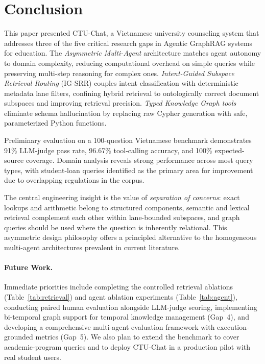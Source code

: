\documentclass[runningheads]{llncs}
\begin{document}
\section{Conclusion}
\label{sec:conclusion}

This paper presented CTU-Chat, a Vietnamese university counseling system that addresses three of the five critical research gaps in Agentic GraphRAG systems for education. The \emph{Asymmetric Multi-Agent} architecture matches agent autonomy to domain complexity, reducing computational overhead on simple queries while preserving multi-step reasoning for complex ones. \emph{Intent-Guided Subspace Retrieval Routing} (IG-SRR) couples intent classification with deterministic metadata lane filters, confining hybrid retrieval to ontologically correct document subspaces and improving retrieval precision. \emph{Typed Knowledge Graph tools} eliminate schema hallucination by replacing raw Cypher generation with safe, parameterized Python functions.

Preliminary evaluation on a 100-question Vietnamese benchmark demonstrates 91\% LLM-judge pass rate, 96.67\% tool-calling accuracy, and 100\% expected-source coverage. Domain analysis reveals strong performance across most query types, with student-loan queries identified as the primary area for improvement due to overlapping regulations in the corpus.

The central engineering insight is the value of \emph{separation of concerns}: exact lookups and arithmetic belong to structured components, semantic and lexical retrieval complement each other within lane-bounded subspaces, and graph queries should be used where the question is inherently relational. This asymmetric design philosophy offers a principled alternative to the homogeneous multi-agent architectures prevalent in current literature.

\paragraph{Future Work.}
Immediate priorities include completing the controlled retrieval ablations (Table~\ref{tab:retrieval}) and agent ablation experiments (Table~\ref{tab:agent}), conducting paired human evaluation alongside LLM-judge scoring, implementing bi-temporal graph support for temporal knowledge management (Gap~4), and developing a comprehensive multi-agent evaluation framework with execution-grounded metrics (Gap~5). We also plan to extend the benchmark to cover academic-program queries and to deploy CTU-Chat in a production pilot with real student users.
\end{document}
